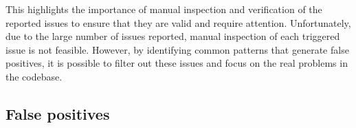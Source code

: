 This highlights the importance of manual inspection and verification of the reported issues to ensure that they are valid and require attention. Unfortunately, due to the large number of issues reported, manual inspection of each triggered issue is not feasible. However, by identifying common patterns that generate false positives, it is possible to filter out these issues and focus on the real problems in the codebase.

\subsection{False positives}

